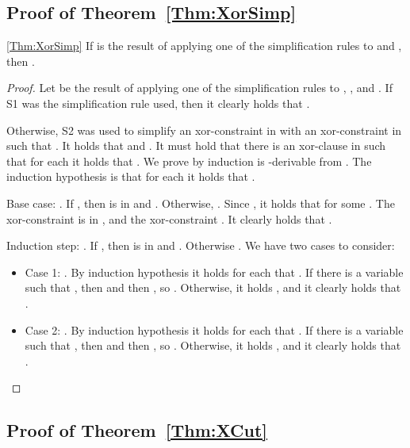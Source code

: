 \subsection{Proof of Theorem~\ref{Thm:XorSimp}}
\begin{retheorem}{\ref{Thm:XorSimp}}
If  is the result of applying
one of the simplification rules to  
and 
, then .  
\end{retheorem}

\begin{proof}
Let  be the result of applying one of the
simplification rules to , , and .
If S1 was the simplification rule used, then it clearly
holds that .

Otherwise, S2 was used to simplify an xor-constraint  in  with
an xor-constraint  in  such that .
It holds that 
and .
It must hold that there is an xor-clause  in  such that for each  it holds that .
We prove by induction  is -derivable from .
The induction hypothesis is that for each  it
holds that .

Base case: . If , then  is in  and . Otherwise, .
Since , it holds that
 for some 
.
The xor-constraint  is in , and the
xor-constraint  .
It clearly holds that .

Induction step: . If , then  is in 
and . Otherwise .
We have two cases to consider:
\begin{itemize}
\item Case 1: .
By induction hypothesis it holds for each 
that .
If there is a variable  such that , then  and then
, so .
Otherwise, it holds , and it clearly holds that .

\item Case 2: .
By induction hypothesis it holds for each 
that .
If there is a variable  such that , then  and then
, so .
Otherwise, it holds , and it clearly holds that .
\end{itemize}
\end{proof}

\subsection{Proof of Theorem~\ref{Thm:XCut}}
\newcommand{\CutAp}{V'_\textup{a}}
\newcommand{\CutBp}{V'_\textup{b}}
\newcommand{\xorpartA}{\xorpart^\textup{a}}
\newcommand{\xorpartB}{\xorpart^\textup{b}}
\newcommand{\Iface}{X'}
\newcommand{\Ifaceparity}{\parity{}'}


